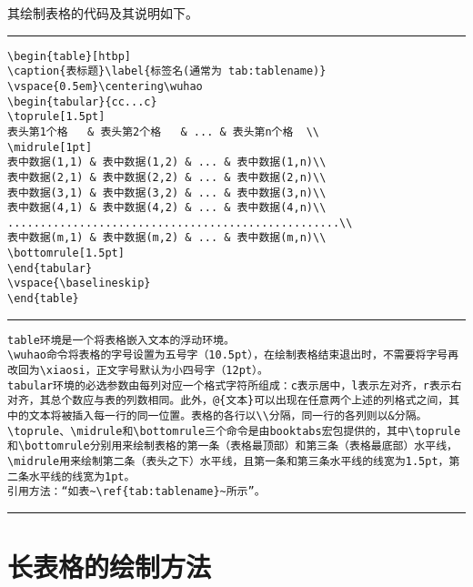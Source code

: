 其绘制表格的代码及其说明如下。
\vspace{1em}\noindent\hrule

\begin{verbatim}
\begin{table}[htbp]
\caption{表标题}\label{标签名(通常为 tab:tablename)}
\vspace{0.5em}\centering\wuhao
\begin{tabular}{cc...c}
\toprule[1.5pt]
表头第1个格   & 表头第2个格   & ... & 表头第n个格  \\
\midrule[1pt]
表中数据(1,1) & 表中数据(1,2) & ... & 表中数据(1,n)\\
表中数据(2,1) & 表中数据(2,2) & ... & 表中数据(2,n)\\
表中数据(3,1) & 表中数据(3,2) & ... & 表中数据(3,n)\\
表中数据(4,1) & 表中数据(4,2) & ... & 表中数据(4,n)\\
...................................................\\
表中数据(m,1) & 表中数据(m,2) & ... & 表中数据(m,n)\\
\bottomrule[1.5pt]
\end{tabular}
\vspace{\baselineskip}
\end{table}
\end{verbatim}

\noindent\hrule

\begin{verbatim}
table环境是一个将表格嵌入文本的浮动环境。
\wuhao命令将表格的字号设置为五号字（10.5pt），在绘制表格结束退出时，不需要将字号再改回为\xiaosi，正文字号默认为小四号字（12pt）。
tabular环境的必选参数由每列对应一个格式字符所组成：c表示居中，l表示左对齐，r表示右对齐，其总个数应与表的列数相同。此外，@{文本}可以出现在任意两个上述的列格式之间，其中的文本将被插入每一行的同一位置。表格的各行以\\分隔，同一行的各列则以&分隔。
\toprule、\midrule和\bottomrule三个命令是由booktabs宏包提供的，其中\toprule和\bottomrule分别用来绘制表格的第一条（表格最顶部）和第三条（表格最底部）水平线，\midrule用来绘制第二条（表头之下）水平线，且第一条和第三条水平线的线宽为1.5pt，第二条水平线的线宽为1pt。
引用方法：“如表~\ref{tab:tablename}~所示”。
\end{verbatim}

\noindent\hrule

\section{长表格的绘制方法}


